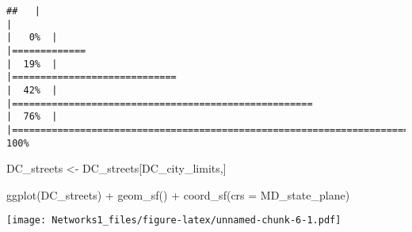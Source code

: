 \documentclass[
]{article}
\newenvironment{Shaded}{\begin{snugshade}}{\end{snugshade}}
\newcommand{\AttributeTok}[1]{\textcolor[rgb]{0.77,0.63,0.00}{#1}}
\newcommand{\FunctionTok}[1]{\textcolor[rgb]{0.00,0.00,0.00}{#1}}
\newcommand{\NormalTok}[1]{#1}
\newcommand{\OtherTok}[1]{\textcolor[rgb]{0.56,0.35,0.01}{#1}}
\newcommand{\SpecialCharTok}[1]{\textcolor[rgb]{0.00,0.00,0.00}{#1}}
\begin{document}
\begin{verbatim}
##   |                                                                              |                                                                      |   0%  |                                                                              |=============                                                         |  19%  |                                                                              |=============================                                         |  42%  |                                                                              |=====================================================                 |  76%  |                                                                              |======================================================================| 100%
\end{verbatim}

\begin{Shaded}
\begin{Highlighting}[]
\NormalTok{DC\_streets }\OtherTok{\textless{}{-}}\NormalTok{ DC\_streets[DC\_city\_limits,]}

\FunctionTok{ggplot}\NormalTok{(DC\_streets) }\SpecialCharTok{+}
  \FunctionTok{geom\_sf}\NormalTok{() }\SpecialCharTok{+}
  \FunctionTok{coord\_sf}\NormalTok{(}\AttributeTok{crs =}\NormalTok{ MD\_state\_plane) }
\end{Highlighting}
\end{Shaded}

\texttt{[image: Networks1\_files/figure-latex/unnamed-chunk-6-1.pdf]}
\end{document}
